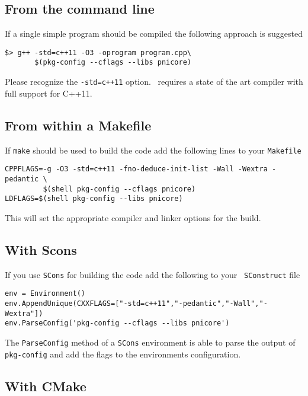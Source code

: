 \subsection{From the command line}

If a single simple program should be compiled the following approach is
suggested 
\begin{verbatim}
$> g++ -std=c++11 -O3 -oprogram program.cpp\
       $(pkg-config --cflags --libs pnicore)
\end{verbatim}
Please recognize the {\tt -std=c++11} option. \libpnicore\ requires a state of
the art compiler with full support for C++11.

\subsection{From within a Makefile}

If {\tt make} should be used to build the code add the following lines to your
{\tt Makefile}

\begin{verbatim}
CPPFLAGS=-g -O3 -std=c++11 -fno-deduce-init-list -Wall -Wextra -pedantic \
		 $(shell pkg-config --cflags pnicore) 
LDFLAGS=$(shell pkg-config --libs pnicore)
\end{verbatim}
This will set the appropriate compiler and linker options for the build.

\subsection{With Scons}

If you use {\tt SCons} for building the code add the following to your {\tt
SConstruct} file
\begin{verbatim}
env = Environment()
env.AppendUnique(CXXFLAGS=["-std=c++11","-pedantic","-Wall","-Wextra"])
env.ParseConfig('pkg-config --cflags --libs pnicore')
\end{verbatim}
The {\tt ParseConfig} method of a {\tt SCons} environment is able to parse the
output of {\tt pkg-config} and add the flags to the environments configuration.

\subsection{With CMake}

